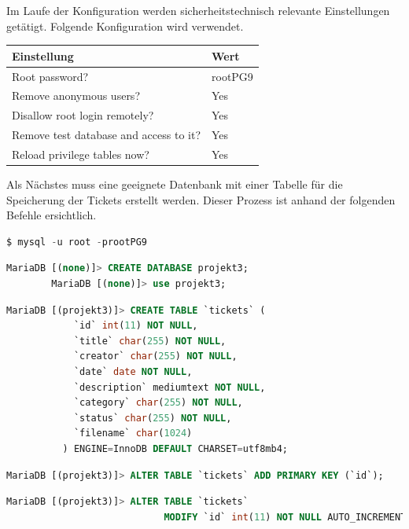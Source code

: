 \documentclass{scrartcl}
\begin{document}
\begin{flushleft}
    Im Laufe der Konfiguration werden sicherheitstechnisch relevante Einstellungen getätigt. Folgende Konfiguration wird verwendet.
    \begin{center}
        \begin{tabular}{| l | l |}
            \hline
            \textbf{Einstellung} & \textbf{Wert}\\ \hline
            Root password? & rootPG9 \\ \hline
            Remove anonymous users? & Yes \\ \hline
            Disallow root login remotely? & Yes \\ \hline
            Remove test database and access to it? & Yes \\ \hline
            Reload privilege tables now? & Yes \\ \hline
        \end{tabular}     
    \end{center}    
    
    \newpage

    Als Nächstes muss eine geeignete Datenbank mit einer Tabelle für die Speicherung der Tickets erstellt werden. Dieser Prozess ist anhand der folgenden Befehle ersichtlich.
    \begin{lstlisting}[language=sql]
        $ mysql -u root -prootPG9 \end{lstlisting}
    \begin{lstlisting}[language=sql]
        MariaDB [(none)]> CREATE DATABASE projekt3; 
        MariaDB [(none)]> use projekt3;\end{lstlisting}
    \begin{lstlisting}[language=sql]
        MariaDB [(projekt3)]> CREATE TABLE `tickets` (
            `id` int(11) NOT NULL,
            `title` char(255) NOT NULL,
            `creator` char(255) NOT NULL,
            `date` date NOT NULL,
            `description` mediumtext NOT NULL,
            `category` char(255) NOT NULL,
            `status` char(255) NOT NULL,
            `filename` char(1024)
          ) ENGINE=InnoDB DEFAULT CHARSET=utf8mb4;\end{lstlisting}
    \begin{lstlisting}[language=sql]
        MariaDB [(projekt3)]> ALTER TABLE `tickets` ADD PRIMARY KEY (`id`);\end{lstlisting}
    \begin{lstlisting}[language=sql]
        MariaDB [(projekt3)]> ALTER TABLE `tickets` 
                            MODIFY `id` int(11) NOT NULL AUTO_INCREMENT;\end{lstlisting}




\end{flushleft}
\end{document}
